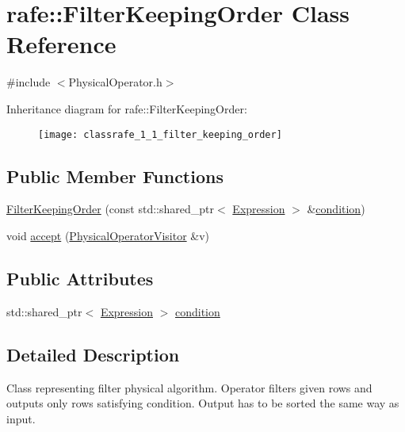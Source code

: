 \hypertarget{classrafe_1_1_filter_keeping_order}{\section{rafe\+:\+:Filter\+Keeping\+Order Class Reference}
\label{classrafe_1_1_filter_keeping_order}
}


{\ttfamily \#include $<$Physical\+Operator.\+h$>$}

Inheritance diagram for rafe\+:\+:Filter\+Keeping\+Order\+:\begin{figure}[H]
\begin{center}
\leavevmode
\texttt{[image: classrafe\_1\_1\_filter\_keeping\_order]}
\end{center}
\end{figure}
\subsection*{Public Member Functions}
\begin{DoxyCompactItemize}
\item 
\hyperlink{classrafe_1_1_filter_keeping_order_a898792d39b2f5c7870111f859aecf0a4}{Filter\+Keeping\+Order} (const std\+::shared\+\_\+ptr$<$ \hyperlink{classrafe_1_1_expression}{Expression} $>$ \&\hyperlink{classrafe_1_1_filter_keeping_order_a94eced2ee1d9bcd744315548476fd292}{condition})
\item 
void \hyperlink{classrafe_1_1_filter_keeping_order_afde88521596d848cde18c0468aeb6062}{accept} (\hyperlink{classrafe_1_1_physical_operator_visitor}{Physical\+Operator\+Visitor} \&v)
\end{DoxyCompactItemize}
\subsection*{Public Attributes}
\begin{DoxyCompactItemize}
\item 
std\+::shared\+\_\+ptr$<$ \hyperlink{classrafe_1_1_expression}{Expression} $>$ \hyperlink{classrafe_1_1_filter_keeping_order_a94eced2ee1d9bcd744315548476fd292}{condition}
\end{DoxyCompactItemize}


\subsection{Detailed Description}
Class representing filter physical algorithm. Operator filters given rows and outputs only rows satisfying condition. Output has to be sorted the same way as input. 

